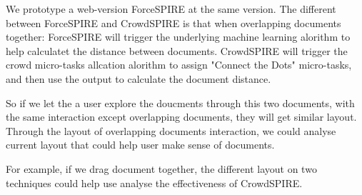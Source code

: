 \documentclass[journal]{vgtc}                %
\begin{document}
We prototype a web-version ForceSPIRE at the same version.
The different between ForceSPIRE and CrowdSPIRE is that when overlapping documents together:
ForceSPIRE will trigger the underlying machine learning alorithm to help calculatet the distance between documents.
CrowdSPIRE will trigger the crowd micro-tasks allcation alorithm to assign "Connect the Dots" micro-tasks, and then use the output to calculate the document distance.

So if we let the a user explore the doucments through this two documents, with the same interaction except overlapping documents, they will get similar layout.
Through the layout of overlapping documents interaction, we could analyse current layout that could help user make sense of documents.

For example, if we drag document together, the different layout on two techniques could help use analyse the effectiveness of CrowdSPIRE.
\end{document}
